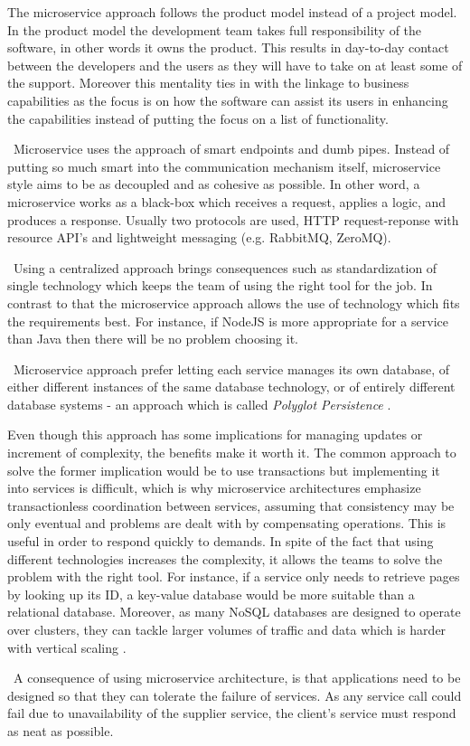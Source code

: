 \begin{description}[style=nextline]
The microservice approach follows the product model instead of a project model. In the product model the development team takes full responsibility of the software, in other words it owns the product. This results in day-to-day contact between the developers and the users as they will have to take on at least some of the support. Moreover this mentality ties in with the linkage to business capabilities as the focus is on how the software can assist its users in enhancing the capabilities instead of putting the focus on a list of functionality.
\item[Smart endpoints and dumb pipes] \hfill \
Microservice uses the approach of smart endpoints and dumb pipes. Instead of putting so much smart into the communication mechanism itself, microservice style aims to be as decoupled and as cohesive as possible. In other word, a microservice works as a black-box which receives a request, applies a logic, and produces a response. Usually two protocols are used, HTTP request-reponse with resource API's and lightweight messaging (e.g. RabbitMQ, ZeroMQ).
\item[Decentralized Governance] \hfill \
Using a centralized approach brings consequences such as standardization of single technology which keeps the team of using the right tool for the job. In contrast to that the microservice approach allows the use of technology which fits the requirements best. For instance, if NodeJS is more appropriate for a service than Java then there will be no problem choosing it.
\item[Decentralized Data Management] \hfill \
Microservice approach prefer letting each service manages its own database, of either different instances of the same database technology, or of entirely different database systems - an approach which is called \emph{Polyglot Persistence} \cite{Leberknight2008}. 

Even though this approach has some implications for managing updates or increment of complexity, the benefits make it worth it. The common approach to solve the former implication would be to use transactions but implementing it into services is difficult, which is why microservice architectures emphasize transactionless coordination between services, assuming that consistency may be only eventual and problems are dealt with by compensating operations. This is useful in order to respond quickly to demands. In spite of the fact that using different technologies increases the complexity, it allows the teams to solve the problem with the right tool. For instance, if a service only needs to retrieve pages by looking up its ID, a key-value database would be more suitable than a relational database. Moreover, as many NoSQL databases are designed to operate over clusters, they can tackle larger volumes of traffic and data which is harder with vertical scaling \cite{Fowler2011}.
\item[Design for failure] \hfill \
A consequence of using microservice architecture, is that applications need to be designed so that they can tolerate the failure of services. As any service call could fail due to unavailability of the supplier service, the client's service must respond as neat as possible.


\end{description}
